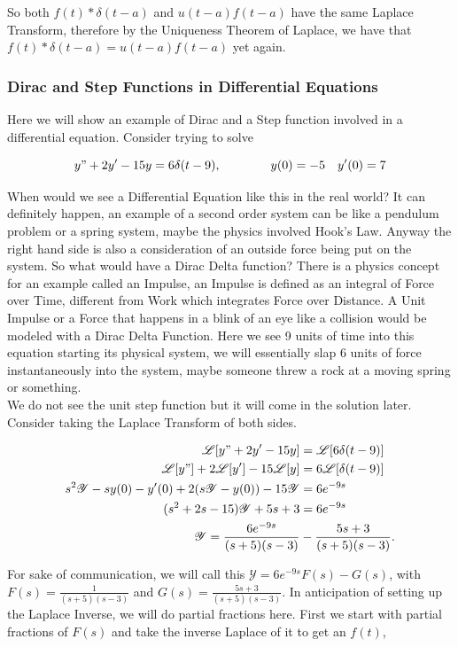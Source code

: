 \documentclass[12pt]{article}
\newcommand{\lp}{\mathscr{L}}
\newcommand{\hugey}{\mathscr{Y}}
\begin{document}
So both $f(t) \ast \delta(t-a)$ and $u(t-a)f(t-a)$ have the same Laplace Transform, therefore by the Uniqueness Theorem of Laplace, we have that $f(t) \ast \delta(t-a) = u(t-a)f(t-a)$ yet again.

\subsubsection{Dirac and Step Functions in Differential Equations}

Here we will show an example of Dirac and a Step function involved in a differential equation. Consider trying to solve

\begin{equation*}
    y"+2y'-15y=6\delta(t-9), \qquad \qquad y(0)=-5 \quad y'(0)=7
\end{equation*}

When would we see a Differential Equation like this in the real world? It can definitely happen, an example of a second order system can be like a pendulum problem or a spring system, maybe the physics involved Hook's Law. Anyway the right hand side is also a consideration of an outside force being put on the system. So what would have a Dirac Delta function? There is a physics concept for an example called an Impulse, an Impulse is defined as an integral of Force over Time, different from Work which integrates Force over Distance. A Unit Impulse or a Force that happens in a blink of an eye like a collision would be modeled with a Dirac Delta Function. Here we see 9 units of time into this equation starting its physical system, we will essentially slap 6 units of force instantaneously into the system, maybe someone threw a rock at a moving spring or something. \\

We do not see the unit step function but it will come in the solution later. Consider taking the Laplace Transform of both sides.

\begin{align*}
    \lp[y"+2y'-15y] &= \lp[6\delta(t-9)] \\
    \lp[y"]+2\lp[y']-15\lp[y] &= 6\lp[\delta(t-9)] \\
    s^2\hugey -sy(0)-y'(0)+2(s\hugey-y(0))-15\hugey &= 6e^{-9s} \\
    (s^2+2s-15)\hugey+5s+3 &= 6e^{-9s} \\
    \hugey = \frac{6e^{-9s}}{(s+5)(s-3)}&-\frac{5s+3}{(s+5)(s-3)}.
\end{align*}

For sake of communication, we will call this $\hugey = 6e^{-9s}F(s)-G(s)$, with $F(s)=\frac{1}{(s+5)(s-3)}$ and $G(s)=\frac{5s+3}{(s+5)(s-3)}$. In anticipation of setting up the Laplace Inverse, we will do partial fractions here. First we start with partial fractions of $F(s)$ and take the inverse Laplace of it to get an $f(t)$,
\end{document}
